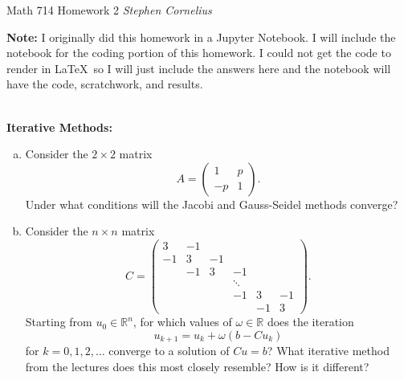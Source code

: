 \documentclass{article}
\begin{document}
\begin{center}
    Math 714
    \hfill Homework 2
    \hfill \textit{Stephen Cornelius}
\end{center}

\textbf{Note:} I originally did this homework in a Jupyter Notebook. I will include the notebook for the coding portion of this homework. I could not get the code to render in \LaTeX~so I will just include the answers here and the notebook will have the code, scratchwork, and results.


\begin{problem} \\
    \textbf{Iterative Methods:} \\
    \begin{enumerate}[(a)]
        \item Consider the $2 \times 2$ matrix
                $$
                        A = \begin{pmatrix}
                        1 & p \\
                        -p & 1
                        \end{pmatrix}.
                $$
                Under what conditions will the Jacobi and Gauss-Seidel methods converge?
        \item Consider the $n \times n$ matrix
                $$
                    C = \begin{pmatrix}
                    3 & -1 \\
                    -1 & 3 & -1 \\
                    & -1 & 3 & -1 \\
                    &    & & \ddots &  \\
                    & & & -1 & 3 & -1  \\
                    & & & & -1 & 3 
                    \end{pmatrix}.
                $$
                Starting from $u_0 \in \mathbb{R}^n$, for which values of $\omega \in \mathbb{R}$ does the iteration 
                $$ u_{k+1} = u_k + \omega(b-Cu_k) $$
                for $k = 0,1,2,\dots$ converge to a solution of $Cu = b$? What iterative method from the lectures does this most closely resemble? How is it different?
    \end{enumerate}
\end{problem}
\end{document}

